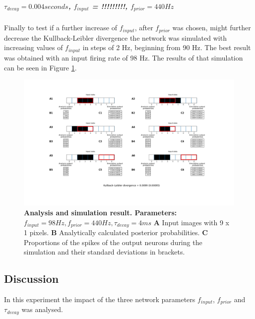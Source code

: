\subparagraph{$\tau_{decay} = 0.004 seconds$, $f_{input}$ = !!!!!!!!!, $f_{prior} = 440 Hz$}
Finally to test if a further increase of $f_{input}$, after $f_{prior}$ was chosen, might further decrease the Kullback-Leibler divergence the network was simulated with increasing values of $f_{input}$ in steps of 2 Hz, beginning from 90 Hz. The best result was obtained with an input firing rate of 98 Hz. The results of that simulation can be seen in Figure \ref{fig:1D_98_440_4}.

\begin{figure}
  \includegraphics[width=\linewidth]{figures/1D/1D_98_440_4.png}
  \caption{\textbf{Analysis and simulation result. Parameters: } $f_{input} = 98 Hz, f_{prior} = 440 Hz, \tau_{decay} = 4 ms$ \textbf{A} Input images with 9 x 1 pixels. \textbf{B} Analytically calculated posterior probabilities. \textbf{C} Proportions of the spikes of the output neurons during the simulation and their standard deviations in brackets.}
  \label{fig:1D_98_440_4}
\end{figure}

\subsection{Discussion}

In this experiment the impact of the three network parameters $f_{input}$, $f_{prior}$ and $\tau_{decay}$ was analysed.

